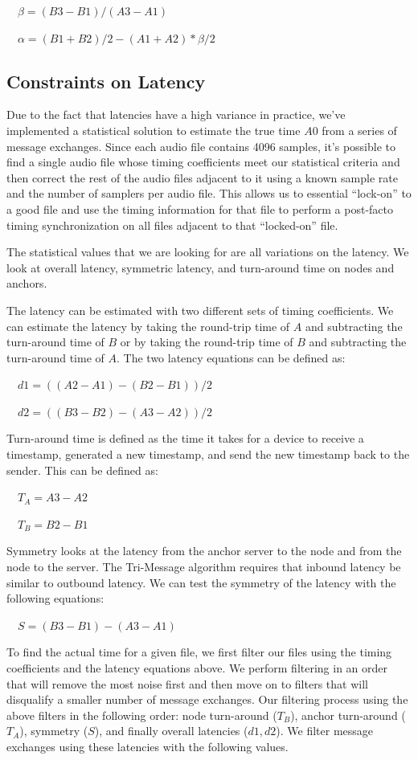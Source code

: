 \ \ $ \beta = (B3 - B1) / (A3 - A1)$\ \ 

\ \ $ \alpha = (B1 + B2) / 2 - (A1 + A2) * \beta / 2$\ \ 

\subsection{Constraints on Latency}
Due to the fact that latencies have a high variance in practice, we've implemented a statistical solution to estimate the true time $ A0$ from a series of message exchanges. Since each audio file contains 4096 samples, it's possible to find a single audio file whose timing coefficients meet our statistical criteria and then correct the rest of the audio files adjacent to it using a known sample rate and the number of samplers per audio file. This allows us to essential ``lock-on'' to a good file and use the timing information for that file to perform a post-facto timing synchronization on all files adjacent to that ``locked-on'' file.

The statistical values that we are looking for are all variations on the latency. We look at overall latency, symmetric latency, and turn-around time on nodes and anchors.

The latency can be estimated with two different sets of timing coefficients. We can estimate the latency by taking the round-trip time of $A$ and subtracting the turn-around time of $B$ or by taking the round-trip time of $B$ and subtracting the turn-around time of $A$. The two latency equations can be defined as:

\ \ $d1 = ((A2-A1) - (B2-B1)) / 2$
\ \ 

\ \ $d2 = ((B3-B2) - (A3-A2)) / 2$\ \ 

Turn-around time is defined as the time it takes for a device to receive a timestamp, generated a new timestamp, and send the new timestamp back to the sender. This can be defined as:

\ \ $ T_A = A3 - A2$\ \

\ \ $ T_B = B2 - B1$\ \ 

Symmetry looks at the latency from the anchor server to the node and from the node to the server. The Tri-Message algorithm requires that inbound latency be similar to outbound latency. We can test the symmetry of the latency with the following equations:

\ \ $ S = (B3 - B1) - (A3 - A1)$\ \ 

To find the actual time for a given file, we first filter our files using the timing coefficients and the latency equations above. We perform filtering in an order that will remove the most noise first and then move on to filters that will disqualify a smaller number of message exchanges. Our filtering process using the above filters in the following order: node turn-around ($ T_B$), anchor turn-around ($ T_A$), symmetry ($ S$), and finally overall latencies ($ d1, d2$). We filter message exchanges using these latencies with the following values.

